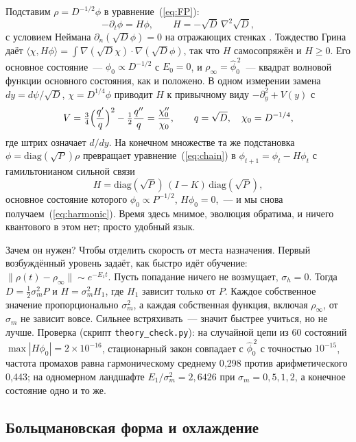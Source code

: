 \documentclass[pre,twocolumn,superscriptaddress,showpacs=false,amsmath,amssymb,nofootinbib]{revtex4-2}
\begin{document}
Подставим $\rho=D^{-1/2}\phi$ в уравнение~(\ref{eq:FP}):
\begin{equation}
-\partial_t\phi=H\phi,\qquad H=-\sqrt D\,\nabla^2\sqrt D ,
\label{eq:H}
\end{equation}
с условием Неймана $\partial_n(\sqrt D\phi)=0$ на отражающих стенках \cite{Risken1989}. Тождество Грина даёт $\langle\chi,H\phi\rangle=\int\nabla(\sqrt D\chi)\cdot\nabla(\sqrt D\phi)$, так что $H$ самосопряжён и $H\ge0$. Его основное состояние~--- $\phi_0\propto D^{-1/2}$ с $E_0=0$, и $\rho_\infty=\hat\phi_0^{\,2}$~--- квадрат волновой функции основного состояния, как и положено. В одном измерении замена $dy=d\psi/\sqrt D$, $\chi=D^{1/4}\phi$ приводит $H$ к привычному виду $-\partial_y^2+V(y)$ с
\begin{equation}
V=\tfrac34\Bigl(\frac{q'}{q}\Bigr)^2-\tfrac12\frac{q''}{q}=\frac{\chi_0''}{\chi_0},\qquad q=\sqrt D,\quad\chi_0=D^{-1/4},
\end{equation}
где штрих означает $d/dy$. На конечном множестве та же подстановка $\phi=\mathrm{diag}(\sqrt P)\rho$ превращает уравнение~(\ref{eq:chain}) в $\phi_{t+1}=\phi_t-H\phi_t$ с гамильтонианом сильной связи
\begin{equation}
H=\mathrm{diag}(\sqrt P)\,(I-K)\,\mathrm{diag}(\sqrt P),
\end{equation}
основное состояние которого $\phi_0\propto P^{-1/2}$, $H\phi_0=0$,~--- и мы снова получаем~(\ref{eq:harmonic}). Время здесь мнимое, эволюция обратима, и ничего квантового в этом нет; просто удобный язык.

Зачем он нужен? Чтобы отделить скорость от места назначения. Первый возбуждённый уровень задаёт, как быстро идёт обучение: $\|\rho(t)-\rho_\infty\|\sim e^{-E_1t}$. Пусть попадание ничего не возмущает, $\sigma_h=0$. Тогда $D=\tfrac12\sigma_m^2P$ и $H=\sigma_m^2H_1$, где $H_1$ зависит только от $P$. Каждое собственное значение пропорционально $\sigma_m^2$, а каждая собственная функция, включая $\rho_\infty$, от $\sigma_m$ не зависит вовсе. Сильнее встряхивать~--- значит быстрее учиться, но не лучше. Проверка (скрипт \texttt{theory\_check.py}): на случайной цепи из 60 состояний $\max|H\phi_0|=2\times10^{-16}$, стационарный закон совпадает с $\hat\phi_0^{\,2}$ с точностью $10^{-15}$, частота промахов равна гармоническому среднему 0{,}298 против арифметического 0{,}443; на одномерном ландшафте $E_1/\sigma_m^2=2{,}6426$ при $\sigma_m=0{,}5,1,2$, а конечное состояние одно и то же.

\subsection{Больцмановская форма и охлаждение}
\end{document}
